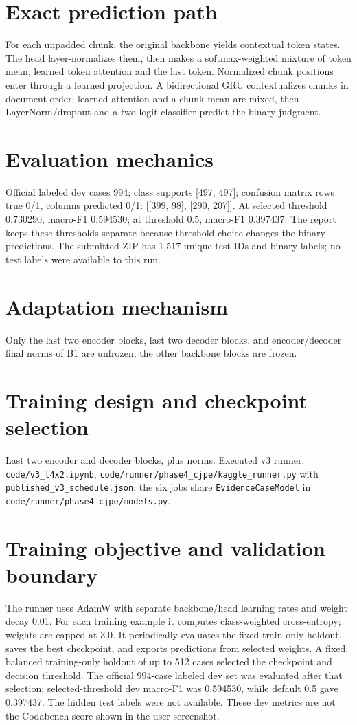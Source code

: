 \documentclass[11pt,a4paper]{article}
\begin{document}
\section{Exact prediction path}
For each unpadded chunk, the original backbone yields contextual token states. The head layer-normalizes them, then makes a softmax-weighted mixture of token mean, learned token attention and the last token. Normalized chunk positions enter through a learned projection. A bidirectional GRU contextualizes chunks in document order; learned attention and a chunk mean are mixed, then LayerNorm/dropout and a two-logit classifier predict the binary judgment.
\section{Evaluation mechanics}
Official labeled dev cases 994; class supports [497, 497]; confusion matrix rows true 0/1, columns predicted 0/1: [[399, 98], [290, 207]]. At selected threshold 0.730290, macro-F1 0.594530; at threshold 0.5, macro-F1 0.397437. The report keeps these thresholds separate because threshold choice changes the binary predictions. The submitted ZIP has 1,517 unique test IDs and binary labels; no test labels were available to this run.
\section{Adaptation mechanism}
Only the last two encoder blocks, last two decoder blocks, and encoder/decoder final norms of B1 are unfrozen; the other backbone blocks are frozen.
\section{Training design and checkpoint selection}
Last two encoder and decoder blocks, plus norms. Executed v3 runner: \texttt{code/v3\_t4x2.ipynb}, \texttt{code/runner/phase4\_cjpe/kaggle\_runner.py} with \texttt{published\_v3\_schedule.json}; the six jobs share \texttt{EvidenceCaseModel} in \texttt{code/runner/phase4\_cjpe/models.py}.
\section{Training objective and validation boundary}
The runner uses AdamW with separate backbone/head learning rates and weight decay 0.01. For each training example it computes class-weighted cross-entropy; weights are capped at 3.0. It periodically evaluates the fixed train-only holdout, saves the best checkpoint, and exports predictions from selected weights. A fixed, balanced training-only holdout of up to 512 cases selected the checkpoint and decision threshold. The official 994-case labeled dev set was evaluated after that selection; selected-threshold dev macro-F1 was 0.594530, while default 0.5 gave 0.397437. The hidden test labels were not available. These dev metrics are not the Codabench score shown in the user screenshot.
\end{document}
